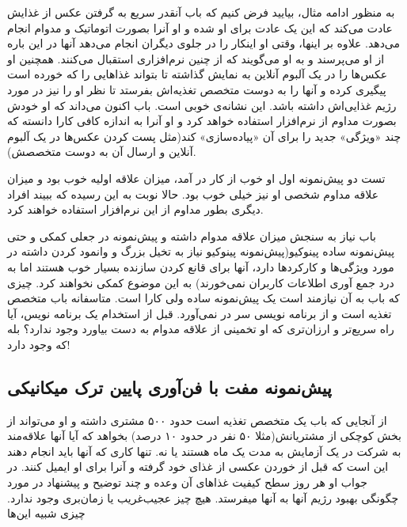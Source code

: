 به منظور ادامه مثال، بیایید فرض کنیم که باب آنقدر سریع به گرفتن عکس از
غذایش عادت می‌کند که این یک عادت برای او شده و او آنرا بصورت اتوماتیک و
مدوام انجام می‌دهد. علاوه بر اینها، وقتی او اینکار را در جلوی دیگران
انجام می‌دهد آنها در این باره از او می‌پرسند و به او می‌گویند که از چنین
نرم‌افزاری استقبال می‌کنند. همچنین او عکس‌ها را در یک آلبوم آنلاین به
نمایش گذاشته تا بتواند غذاهایی را که خورده است پیگیری کرده و آنها را به
دوست متخصص تغذیه‌اش بفرستد تا نظر او را نیز در مورد رژیم غذایی‌اش داشته
باشد. این نشانه‌ی خوبی است. باب اکنون می‌داند که او خودش بصورت مداوم از
نرم‌افزار استفاده خواهد کرد و او آنرا به اندازه کافی کارا دانسته که چند
«ویژگی» جدید را برای آن «پیاده‌سازی» کند(مثل پست کردن عکس‌ها در یک آلبوم
آنلاین و ارسال آن به دوست متخصصش).

تست دو پیش‌نمونه اول او خوب از کار در آمد، میزان علاقه اولیه خوب بود و
میزان علاقه مداوم شخصی او نیز خیلی خوب بود. حالا نوبت به این رسیده که
ببیند افراد دیگری بطور مداوم از این نرم‌افزار استفاده خواهند کرد.

باب نیاز به سنجش میزان علاقه مدوام داشته و پیش‌نمونه در جعلی کمکی و حتی
پیش‌نمونه ساده پینوکیو(پیش‌نمونه پینوکیو نیاز به تخیل بزرگ و وانمود کردن
داشته در مورد ویژگی‌ها و کارکردها دارد، آنها برای قانع کردن سازنده بسیار
خوب هستند اما به درد جمع آوری اطلاعات کاربران نمی‌خورند) به این موضوع
کمکی نخواهند کرد. چیزی که باب به آن نیازمند است یک پیش‌نمونه ساده ولی
کارا است. متاسفانه باب متخصص تغذیه است و از برنامه نویسی سر در نمی‌آورد.
قبل از استخدام یک برنامه نویس، آیا راه سریع‌تر و ارزان‌تری که او تخمینی
از علاقه مدوام به دست بیاورد وجود ندارد؟ بله که وجود دارد!

\subsection{پیش‌نمونه مفت با فن‌آوری پایین ترک
میکانیکی}\label{ux67eux6ccux634ux646ux645ux648ux646ux647-ux645ux641ux62a-ux628ux627-ux641ux646ux622ux648ux631ux6cc-ux67eux627ux6ccux6ccux646-ux62aux631ux6a9-ux645ux6ccux6a9ux627ux646ux6ccux6a9ux6cc}

از آنجایی که باب یک متخصص تغذیه است حدود ۵۰۰ مشتری داشته و او می‌تواند
از بخش کوچکی از مشتریانش(مثلا ۵۰ نفر در حدود ۱۰ درصد) بخواهد که آیا آنها
علاقه‌مند به شرکت در یک آزمایش به مدت یک ماه هستند یا نه. تنها کاری که
آنها باید انجام دهند این است که قبل از خوردن عکسی از غذای خود گرفته و
آنرا برای او ایمیل کنند. در جواب او هر روز سطح کیفیت غذاهای آن وعده و
چند توضیح و پیشنهاد در مورد چگونگی بهبود رژیم آنها به آنها میفرستد. هیچ
چیز عجیب‌غریب یا زمان‌بری وجود ندارد. چیزی شبیه این‌ها

